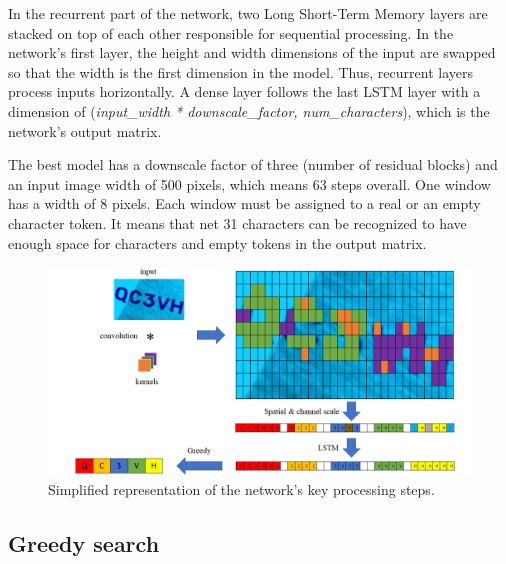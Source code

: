 In the recurrent part of the network, two Long Short-Term Memory\cite{LSTM} layers are stacked on top of each other responsible for sequential processing. In the network's first layer, the height and width dimensions of the input are swapped so that the width is the first dimension in the model. Thus, recurrent layers process inputs horizontally. A dense layer follows the last LSTM layer with a dimension of (\textit{input\_width * downscale\_factor, num\_characters}), which is the network's output matrix.

The best model has a downscale factor of three (number of residual blocks) and an input image width of 500 pixels, which means 63 steps overall. One window has a width of 8 pixels. Each window must be assigned to a real or an empty character token. It means that net 31 characters can be recognized to have enough space for characters and empty tokens in the output matrix.

\begin{figure}[htb]
 \centerline{\includegraphics[width=1.0\columnwidth]{.//Figure/OCR/Slide5.PNG}}
 \caption{Simplified representation of the network's key processing steps.}
 \label{fig:simple}
\end{figure}

\subsection{Greedy search}

